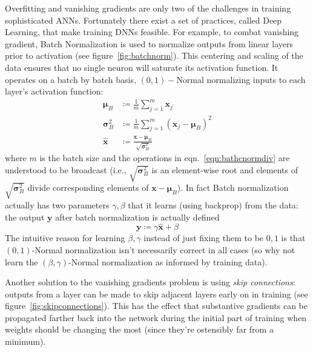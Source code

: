 

Overfitting and vanishing gradients are only two of the challenges in training sophisticated ANNs.
%
Fortunately there exist a set of practices, called Deep Learning, that make training DNNs feasible.
%
For example, to combat vanishing gradient, Batch Normalization \cite{ioffe2015batch} is used to normalize outputs from linear layers prior to activation (see figure~\ref{fig:batchnorm}).
%
This centering and scaling of the data ensures that no single neuron will saturate its activation function.
%
It operates on a batch by batch basis, \((0,1)-\)Normal normalizing inputs to each layer's activation function:
\begin{align}
    \bm{\mu} _{B}        & \coloneqq {\frac {1}{m}}\sum _{j=1}^{m}\bm{x}_{j}                                             \\
    \bm{\sigma} _{B}^{2} & \coloneqq{\frac {1}{m}}\sum _{j=1}^{m}(\bm{x}_{j}-\bm{\mu}_{B})^{2}                           \\
    {\hat {\bm{x}}}      & \coloneqq {\frac {\bm{x}-\bm{\mu}_{B}}{\sqrt {\bm{\sigma}_{B}^{2}}}} \label{eqn:bathcnormdiv}
\end{align}
where \(m\) is the batch size and the operations in eqn.~\eqref{eqn:bathcnormdiv} are understood to be broadcast (i.e., \(\sqrt {\bm{\sigma} _{B}^{2}}\) is an element-wise root and elements of \(\sqrt {\bm{\sigma} _{B}^{2}}\) divide corresponding elements of \(\bm{x}-\bm{\mu}_{B}\)).
%
In fact Batch normalization actually has two parameters \(\gamma, \beta\) that it learns (using backprop) from the data: the output \(\bm{y}\) after batch normalization is actually defined
\begin{equation}
    \bm{y} \coloneqq \gamma \bm{\hat{x}} + \beta 
\end{equation}
The intuitive reason for learning \(\beta, \gamma\) instead of just fixing them to be \(0,1\) is that \((0,1)\)-Normal normalization isn't necessarily correct in all cases (so why not learn the \((\beta,\gamma)\)-Normal normalization as informed by training data).
%


Another solution to the vanishing gradients problem is using \textit{skip connections}: outputs from a layer can be made to skip adjacent layers early on in training (see figure~\ref{fig:skipconnections}).
%
This has the effect that substantive gradients can be propagated farther back into the network during the initial part of training when weights should be changing the most (since they're ostensibly far from a minimum).

